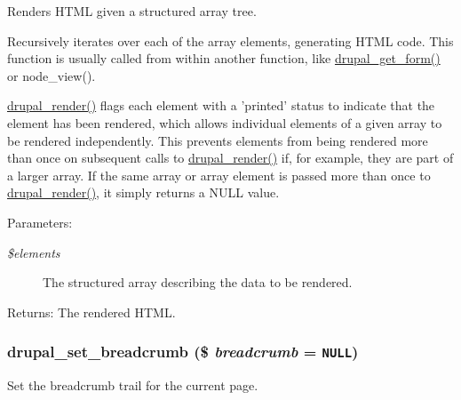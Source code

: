 Renders HTML given a structured array tree.

Recursively iterates over each of the array elements, generating HTML code. This function is usually called from within another function, like \hyperlink{group__form__api_g720df81a837b06dfe19daf1c1eea3437}{drupal\_\-get\_\-form()} or node\_\-view().

\hyperlink{common_8inc_05798b44e8d6c496d4bee5cc32fa7851}{drupal\_\-render()} flags each element with a 'printed' status to indicate that the element has been rendered, which allows individual elements of a given array to be rendered independently. This prevents elements from being rendered more than once on subsequent calls to \hyperlink{common_8inc_05798b44e8d6c496d4bee5cc32fa7851}{drupal\_\-render()} if, for example, they are part of a larger array. If the same array or array element is passed more than once to \hyperlink{common_8inc_05798b44e8d6c496d4bee5cc32fa7851}{drupal\_\-render()}, it simply returns a NULL value.

\begin{Desc}
\item[Parameters:]
\begin{description}
\item[{\em \$elements}]The structured array describing the data to be rendered. \end{description}
\end{Desc}
\begin{Desc}
\item[Returns:]The rendered HTML. \end{Desc}
\hypertarget{common_8inc_666113d06fa6ea461aff580e5c511eb0}{
\subsubsection[{drupal\_\-set\_\-breadcrumb}]{\setlength{\rightskip}{0pt plus 5cm}drupal\_\-set\_\-breadcrumb (\$ {\em breadcrumb} = {\tt NULL})}}
\label{common_8inc_666113d06fa6ea461aff580e5c511eb0}


Set the breadcrumb trail for the current page.

